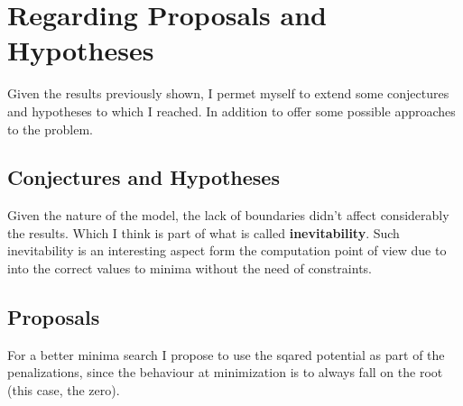 \chapter{Regarding Proposals and Hypotheses}

Given the results previously shown, I permet myself to extend
some conjectures and hypotheses to which I reached. In addition
to offer some possible approaches to the problem.

\section{Conjectures and Hypotheses}
Given the nature of the model, the lack of boundaries didn't
affect considerably the results. Which I think is part of what
is called \textbf{inevitability}. Such inevitability is an
interesting aspect form the computation point of view due to
 into the correct values to minima without
the need of constraints.


\section{Proposals}

For a better minima search I propose to use the sqared
potential as part of the penalizations, since the behaviour
at minimization is to always fall on the root (this case, the
zero).
